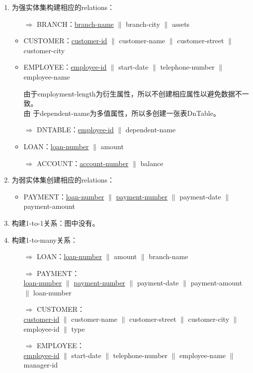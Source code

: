 \documentclass[b5paper, twoside]{article}
\newenvironment{smallmdframed}
  {\begin{mdframed}[linewidth=0pt, backgroundcolor=pink!20]\small}
  {\end{mdframed}}
\begin{document}
\begin{enumerate}
	\item 为强实体集构建相应的relations：
	\begin{itemize}
		\item[$\Rightarrow$] BRANCH：\underline{branch-name} $\|$ branch-city 
		$\|$ assets
		\item CUSTOMER：\underline{customer-id} $\|$ customer-name $\|$ 
		customer-street $\|$ customer-city
		\item EMPLOYEE：\underline{employee-id} $\|$ start-date $\|$ 
		telephone-number $\|$ employee-name
		\begin{smallmdframed}
			由于employment-length为衍生属性，所以不创建相应属性以避免数据不一致。\\由
			于dependent-name为多值属性，所以多创建一张表DnTable。
		\end{smallmdframed}
		\item[$\Rightarrow$] DNTABLE：\underline{employee-id} $\|$ 
		dependent-name
		\item LOAN：\underline{loan-number} $\|$ amount
		\item[$\Rightarrow$] ACCOUNT：\underline{account-number} $\|$ balance
	\end{itemize}
	\item 为弱实体集创建相应的relations：
	\begin{itemize}
		\item PAYMENT：\underline{loan-number} $\|$ \underline{payment-number} 
		$\|$ payment-date $\|$ payment-amount
	\end{itemize}
	\item 构建1-to-1关系：图中没有。
	\item 构建1-to-many关系：
	\begin{itemize}
		\item[$\Rightarrow$] LOAN：\underline{loan-number} $\|$ amount $\|$ 
		branch-name
		\item[$\Rightarrow$] PAYMENT：\\\underline{loan-number} $\|$ 
		\underline{payment-number} 
		$\|$ payment-date $\|$ payment-amount $\|$ loan-number
		\item[$\Rightarrow$] CUSTOMER：\\\underline{customer-id} $\|$ 
		customer-name $\|$ 
		customer-street $\|$ customer-city $\|$ employee-id $\|$ type
		\item[$\Rightarrow$] EMPLOYEE：\\\underline{employee-id} $\|$ 
		start-date $\|$ 
		telephone-number $\|$ employee-name $\|$ manager-id

\end{itemize}
\end{enumerate}
\end{document}
